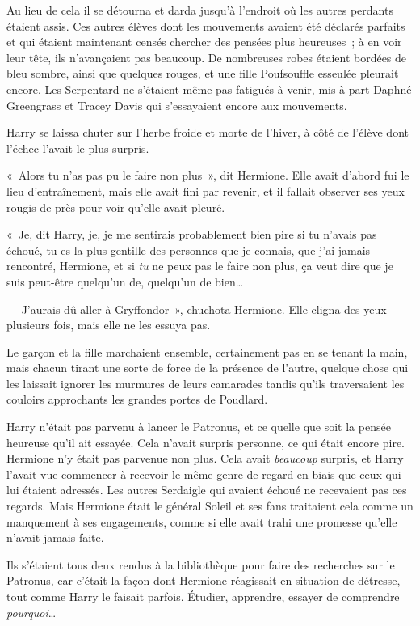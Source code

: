 Au lieu de cela il se détourna et darda jusqu'à l'endroit où les autres perdants étaient assis.
Ces autres élèves dont les mouvements avaient été déclarés parfaits et qui étaient maintenant censés chercher des pensées plus heureuses~; à en voir leur tête, ils n'avançaient pas beaucoup.
De nombreuses robes étaient bordées de bleu sombre, ainsi que quelques rouges, et une fille Poufsouffle esseulée pleurait encore.
Les Serpentard ne s'étaient même pas fatigués à venir, mis à part Daphné Greengrass et Tracey Davis qui s'essayaient encore aux mouvements.

Harry se laissa chuter sur l'herbe froide et morte de l'hiver, à côté de l'élève dont l'échec l'avait le plus surpris.

«~Alors tu n'as pas pu le faire non plus~», dit Hermione.
Elle avait d'abord fui le lieu d'entraînement, mais elle avait fini par revenir, et il fallait observer ses yeux rougis de près pour voir qu'elle avait pleuré.

«~Je, dit Harry, je, je me sentirais probablement bien pire si tu n'avais pas échoué, tu es la plus gentille des personnes que je connais, que j'ai jamais rencontré, Hermione, et si \emph{tu} ne peux pas le faire non plus, ça veut dire que je suis peut-être quelqu'un de, quelqu'un de bien…

--- J'aurais dû aller à Gryffondor~», chuchota Hermione.
Elle cligna des yeux plusieurs fois, mais elle ne les essuya pas.

\later

Le garçon et la fille marchaient ensemble, certainement pas en se tenant la main, mais chacun tirant une sorte de force de la présence de l'autre, quelque chose qui les laissait ignorer les murmures de leurs camarades tandis qu'ils traversaient les couloirs approchants les grandes portes de Poudlard.

Harry n'était pas parvenu à lancer le Patronus, et ce quelle que soit la pensée heureuse qu'il ait essayée.
Cela n'avait surpris personne, ce qui était encore pire.
Hermione n'y était pas parvenue non plus.
Cela avait \emph{beaucoup} surpris, et Harry l'avait vue commencer à recevoir le même genre de regard en biais que ceux qui lui étaient adressés.
Les autres Serdaigle qui avaient échoué ne recevaient pas ces regards.
Mais Hermione était le général Soleil et ses fans traitaient cela comme un manquement à ses engagements, comme si elle avait trahi une promesse qu'elle n'avait jamais faite.

Ils s'étaient tous deux rendus à la bibliothèque pour faire des recherches sur le Patronus, car c'était la façon dont Hermione réagissait en situation de détresse, tout comme Harry le faisait parfois.
Étudier, apprendre, essayer de comprendre \emph{pourquoi}…

